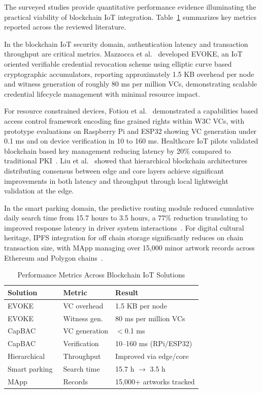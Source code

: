\documentclass[conference]{IEEEtran}
\begin{document}
The surveyed studies provide quantitative performance evidence illuminating the practical viability of blockchain IoT integration. Table~\ref{tab:performance} summarizes key metrics reported across the reviewed literature.

In the blockchain IoT security domain, authentication latency and transaction throughput are critical metrics. Mazzocca et al.~\cite{b20} developed EVOKE, an IoT oriented verifiable credential revocation scheme using elliptic curve based cryptographic accumulators, reporting approximately 1.5 KB overhead per node and witness generation of roughly 80 ms per million VCs, demonstrating scalable credential lifecycle management with minimal resource impact.

For resource constrained devices, Fotiou et al.~\cite{b21} demonstrated a capabilities based access control framework encoding fine grained rights within W3C VCs, with prototype evaluations on Raspberry Pi and ESP32 showing VC generation under 0.1 ms and on device verification in 10 to 160 ms. Healthcare IoT pilots validated blockchain based key management reducing latency by 20\% compared to traditional PKI~\cite{b1}. Liu et al.~\cite{b13} showed that hierarchical blockchain architectures distributing consensus between edge and core layers achieve significant improvements in both latency and throughput through local lightweight validation at the edge.

In the smart parking domain, the predictive routing module reduced cumulative daily search time from 15.7 hours to 3.5 hours, a 77\% reduction translating to improved response latency in driver system interactions~\cite{b3}. For digital cultural heritage, IPFS integration for off chain storage significantly reduces on chain transaction size, with MApp managing over 15,000 minor artwork records across Ethereum and Polygon chains~\cite{b17}.

\begin{table}[htbp]
\caption{Performance Metrics Across Blockchain IoT Solutions}
\begin{center}
\begin{tabular}{p{2.2cm}p{2.2cm}p{3.2cm}}
\toprule
\textbf{Solution} & \textbf{Metric} & \textbf{Result} \\
\midrule
EVOKE~\cite{b20} & VC overhead & 1.5 KB per node \\
\midrule
EVOKE~\cite{b20} & Witness gen. & 80 ms per million VCs \\
\midrule
CapBAC~\cite{b21} & VC generation & $<$0.1 ms \\
\midrule
CapBAC~\cite{b21} & Verification & 10--160 ms (RPi/ESP32) \\
\midrule
Hierarchical~\cite{b13} & Throughput & Improved via edge/core \\
\midrule
Smart parking~\cite{b3} & Search time & 15.7 h $\rightarrow$ 3.5 h \\
\midrule
MApp~\cite{b17} & Records & 15,000+ artworks tracked \\
\bottomrule
\end{tabular}
\label{tab:performance}
\end{center}
\end{table}
\end{document}

